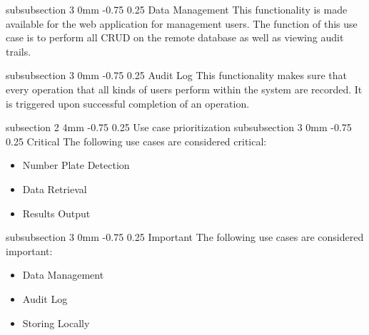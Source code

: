 \documentclass[12pt]{article}
\makeatletter
\renewcommand{\section}{\@startsection
   {section}%
   {1}%
   {0mm}%
   {-1.5\baselineskip}%
   {0.5\baselineskip}%
   {\sffamily\bfseries\upshape\normalsize}}%
\renewcommand{\subsection}{\@startsection
   {subsection}%
   {2}%
   {4mm}%
   {-0.75\baselineskip}%
   {0.25\baselineskip}%
   {\rmfamily\normalfont\scshape\normalsize}}%
\renewcommand{\subsubsection}{\@startsection
   {subsubsection}%
   {3}%
   {0mm}%
   {-0.75\baselineskip}%
   {0.25\baselineskip}%
   {\rmfamily\normalfont\slshape\normalsize}}%
\makeatother
\begin{document}
                    		\subsubsection{Data Management}
                    				This functionality is made available for the web application for management users. The function of this use case is to perform all CRUD on the remote database as well as viewing audit trails.
                    				
                    		\subsubsection{Audit Log}
                    				This functionality makes sure that every operation that all kinds of users perform within the system are recorded. It is triggered upon successful completion of an operation.
                    				
                    \subsection{Use case prioritization}
                    		\subsubsection{Critical}
                    				The following use cases are considered critical:
                    				\begin{itemize}
	                    					\item Number Plate Detection
	                    					\item Data Retrieval
	                    					\item Results Output
                    				\end{itemize}
                    				
                    		\subsubsection{Important}
                    		The following use cases are considered important:
                    				\begin{itemize}
		                    				\item Data Management
		                    				\item Audit Log
		                    				\item Storing Locally
                    				\end{itemize}
                    		
                    		
             
\end{document}
